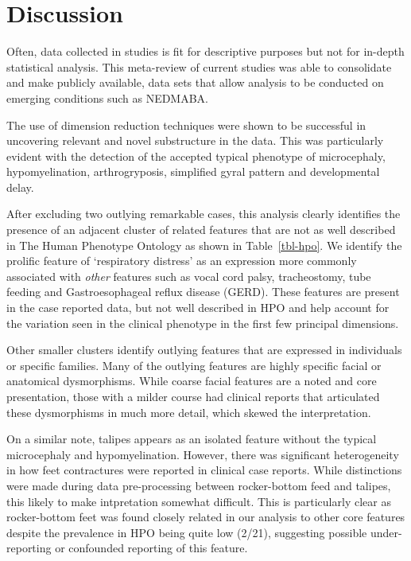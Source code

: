 \documentclass[
  authoryear,
  preprint,
  3p]{elsarticle}
\begin{document}
\hypertarget{discussion}{%
\section{Discussion}\label{discussion}}

Often, data collected in studies is fit for descriptive purposes but not
for in-depth statistical analysis. This meta-review of current studies
was able to consolidate and make publicly available, data sets that
allow analysis to be conducted on emerging conditions such as NEDMABA.

The use of dimension reduction techniques were shown to be successful in
uncovering relevant and novel substructure in the data. This was
particularly evident with the detection of the accepted typical
phenotype of microcephaly, hypomyelination, arthrogryposis, simplified
gyral pattern and developmental delay.

After excluding two outlying remarkable cases, this analysis clearly
identifies the presence of an adjacent cluster of related features that
are not as well described in The Human Phenotype Ontology
\citep{kohler2021human} as shown in Table~\ref{tbl-hpo}. We identify the
prolific feature of `respiratory distress' as an expression more
commonly associated with \emph{other} features such as vocal cord palsy,
tracheostomy, tube feeding and Gastroesophageal reflux disease (GERD).
These features are present in the case reported data, but not well
described in HPO and help account for the variation seen in the clinical
phenotype in the first few principal dimensions.

Other smaller clusters identify outlying features that are expressed in
individuals or specific families. Many of the outlying features are
highly specific facial or anatomical dysmorphisms. While coarse facial
features are a noted and core presentation, those with a milder course
had clinical reports that articulated these dysmorphisms in much more
detail, which skewed the interpretation.

On a similar note, talipes appears as an isolated feature without the
typical microcephaly and hypomyelination. However, there was significant
heterogeneity in how feet contractures were reported in clinical case
reports. While distinctions were made during data pre-processing between
rocker-bottom feed and talipes, this likely to make intpretation
somewhat difficult. This is particularly clear as rocker-bottom feet was
found closely related in our analysis to other core features despite the
prevalence in HPO being quite low (2/21), suggesting possible
under-reporting or confounded reporting of this feature.
\end{document}
